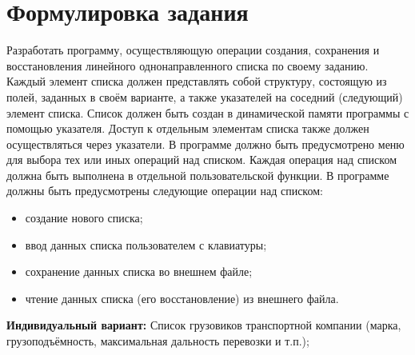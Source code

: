 \section*{Формулировка задания}

Разработать программу, осуществляющую операции создания,
сохранения и восстановления линейного однонаправленного списка по
своему заданию.
Каждый элемент списка должен представлять собой структуру,
состоящую из полей, заданных в своём варианте, а также указателей на
соседний (следующий) элемент списка.
Список должен быть создан в динамической памяти программы с
помощью указателя.
Доступ к отдельным элементам списка также должен
осуществляться через указатели.
В программе должно быть предусмотрено меню для выбора тех или
иных операций над списком.
Каждая операция над списком должна быть
выполнена в отдельной пользовательской функции.
В программе должны быть предусмотрены следующие операции над
списком:
\begin{itemize}
    \item создание нового списка;
    \item ввод данных списка пользователем с клавиатуры;
    \item сохранение данных списка во внешнем файле;
    \item чтение данных списка (его восстановление) из внешнего файла.
\end{itemize}

\textbf{Индивидуальный вариант:}
Список грузовиков транспортной компании (марка, грузоподъёмность,
максимальная дальность перевозки и
т.п.);

